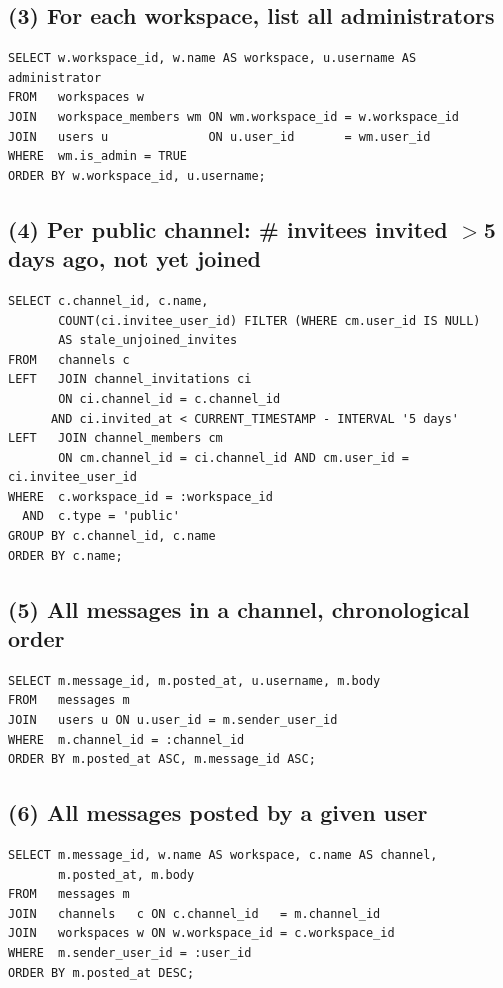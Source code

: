 \documentclass[11pt,letterpaper]{article}
\begin{document}
\subsection*{(3) For each workspace, list all administrators}
\begin{lstlisting}
SELECT w.workspace_id, w.name AS workspace, u.username AS administrator
FROM   workspaces w
JOIN   workspace_members wm ON wm.workspace_id = w.workspace_id
JOIN   users u              ON u.user_id       = wm.user_id
WHERE  wm.is_admin = TRUE
ORDER BY w.workspace_id, u.username;
\end{lstlisting}

\subsection*{(4) Per public channel: \# invitees invited $>$5 days ago, not yet joined}
\begin{lstlisting}
SELECT c.channel_id, c.name,
       COUNT(ci.invitee_user_id) FILTER (WHERE cm.user_id IS NULL)
       AS stale_unjoined_invites
FROM   channels c
LEFT   JOIN channel_invitations ci
       ON ci.channel_id = c.channel_id
      AND ci.invited_at < CURRENT_TIMESTAMP - INTERVAL '5 days'
LEFT   JOIN channel_members cm
       ON cm.channel_id = ci.channel_id AND cm.user_id = ci.invitee_user_id
WHERE  c.workspace_id = :workspace_id
  AND  c.type = 'public'
GROUP BY c.channel_id, c.name
ORDER BY c.name;
\end{lstlisting}

\subsection*{(5) All messages in a channel, chronological order}
\begin{lstlisting}
SELECT m.message_id, m.posted_at, u.username, m.body
FROM   messages m
JOIN   users u ON u.user_id = m.sender_user_id
WHERE  m.channel_id = :channel_id
ORDER BY m.posted_at ASC, m.message_id ASC;
\end{lstlisting}

\subsection*{(6) All messages posted by a given user}
\begin{lstlisting}
SELECT m.message_id, w.name AS workspace, c.name AS channel,
       m.posted_at, m.body
FROM   messages m
JOIN   channels   c ON c.channel_id   = m.channel_id
JOIN   workspaces w ON w.workspace_id = c.workspace_id
WHERE  m.sender_user_id = :user_id
ORDER BY m.posted_at DESC;
\end{lstlisting}
\end{document}
